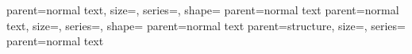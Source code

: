 


{parent=normal text, size=\large, series=\mdseries, shape=\upshape}
{parent=normal text}
{parent=normal text, size=\small, series=\mdseries, shape=\itshape}
{parent=normal text}
{parent=structure, size=\normalsize, series=\bfseries}
{parent=normal text}

\makeatletter
{}
\makeatother

\makeatletter
\renewcommand{\beamer@insttitle}[1]{\highlight{\textsuperscript{\kern.75pt \textit{#1}}}}
\renewcommand{\beamer@instinst}[1]{\beamer@insttitle{#1}\ignorespaces}
\renewcommand{\beamer@andinst}{\\[0.33\baselineskip]}
\makeatother






